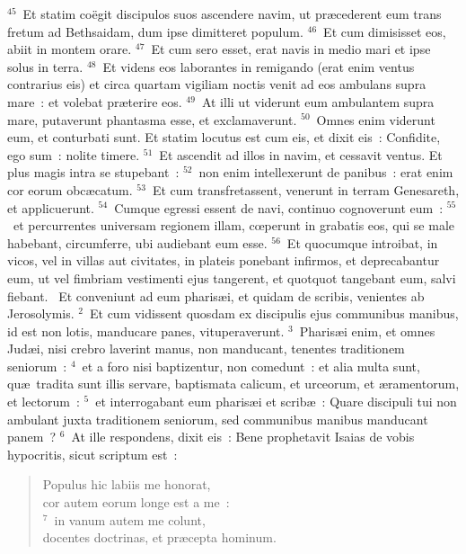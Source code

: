 ${}^{45}$~Et statim co\"egit discipulos suos ascendere navim, ut pr\ae cederent eum trans fretum ad Bethsaidam, dum ipse dimitteret populum.
${}^{46}$~Et cum dimisisset eos, abiit in montem orare.
${}^{47}$~Et cum sero esset, erat navis in medio mari et ipse solus in terra.
${}^{48}$~Et videns eos laborantes in remigando (erat enim ventus contrarius eis) et circa quartam vigiliam noctis venit ad eos ambulans supra mare~: et volebat pr\ae terire eos.
${}^{49}$~At illi ut viderunt eum ambulantem supra mare, putaverunt phantasma esse, et exclamaverunt.
${}^{50}$~Omnes enim viderunt eum, et conturbati sunt. Et statim locutus est cum eis, et dixit eis~: Confidite, ego sum~: nolite timere.
${}^{51}$~Et ascendit ad illos in navim, et cessavit ventus. Et plus magis intra se stupebant~:
${}^{52}$~non enim intellexerunt de panibus~: erat enim cor eorum obc\ae catum.
${}^{53}$~Et cum transfretassent, venerunt in terram Genesareth, et applicuerunt.
${}^{54}$~Cumque egressi essent de navi, continuo cognoverunt eum~:
${}^{55}$~et percurrentes universam regionem illam, cœperunt in grabatis eos, qui se male habebant, circumferre, ubi audiebant eum esse.
${}^{56}$~Et quocumque introibat, in vicos, vel in villas aut civitates, in plateis ponebant infirmos, et deprecabantur eum, ut vel fimbriam vestimenti ejus tangerent, et quotquot tangebant eum, salvi fiebant.
~\lettrine[lines=10,image=true,loversize=0.05,lraise=-0.03]{E}{}t conveniunt ad eum pharis\ae i, et quidam de scribis, venientes ab Jerosolymis.
${}^{2}$~Et cum vidissent quosdam ex discipulis ejus communibus manibus, id est non lotis, manducare panes, vituperaverunt.
${}^{3}$~Pharis\ae i enim, et omnes Jud\ae i, nisi crebro laverint manus, non manducant, tenentes traditionem seniorum~:
${}^{4}$~et a foro nisi baptizentur, non comedunt~: et alia multa sunt, qu\ae\ tradita sunt illis servare, baptismata calicum, et urceorum, et \ae ramentorum, et lectorum~:
${}^{5}$~et interrogabant eum pharis\ae i et scrib\ae~: Quare discipuli tui non ambulant juxta traditionem seniorum, sed communibus manibus manducant panem~?
${}^{6}$~At ille respondens, dixit eis~: Bene prophetavit Isaias de vobis hypocritis, sicut scriptum est~: \begin{flushleft}\begin{verse}Populus hic labiis me honorat,\\ cor autem eorum longe est a me~:\\
${}^{7}$~in vanum autem me colunt,\\ docentes doctrinas, et pr\ae cepta hominum.\end{verse}\end{flushleft}


